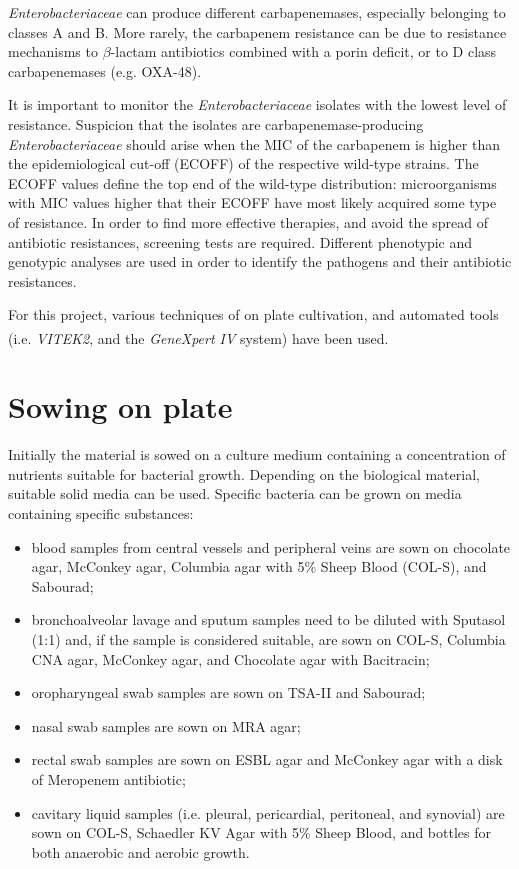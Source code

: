 \documentclass[11pt]{report}
\begin{document}
\emph{Enterobacteriaceae} can produce different carbapenemases, especially belonging to classes A and B.
More rarely, the carbapenem resistance can be due to resistance mechanisms to $\beta$-lactam antibiotics combined with a porin deficit, or to D class carbapenemases (e.g. OXA-48).

It is important to monitor the \emph{Enterobacteriaceae} isolates with the lowest level of resistance.
Suspicion that the isolates are carbapenemase-producing \emph{Enterobacteriaceae} should arise when the MIC of the carbapenem is higher than the epidemiological cut-off (ECOFF) of the respective wild-type strains.
The ECOFF values define the top end of the wild-type distribution: microorganisms with MIC values higher that their ECOFF have most likely acquired some type of resistance.
In order to find more effective therapies, and avoid the spread of antibiotic resistances, screening tests are required.
Different phenotypic and genotypic analyses are used in order to identify the pathogens and their antibiotic resistances.

For this project, various techniques of on plate cultivation, and automated tools (i.e. \emph{VITEK}\textsuperscript{\textregistered}\emph{2}, and the \emph{GeneXpert\textsuperscript{\textregistered} IV} system) have been used.

\section{Sowing on plate}
Initially the material is sowed on a culture medium containing a concentration of nutrients suitable for bacterial growth.
Depending on the biological material, suitable solid media can be used.
Specific bacteria can be grown on media containing specific substances:
\begin{itemize}
\item blood samples from central vessels and peripheral veins are sown on chocolate agar, McConkey agar, Columbia agar with 5$\%$ Sheep Blood (COL-S), and Sabourad;
\item bronchoalveolar lavage and sputum samples need to be diluted with Sputasol (1:1) and, if the sample is considered suitable, are sown on COL-S, Columbia CNA agar, McConkey agar, and Chocolate agar with Bacitracin;
\item oropharyngeal swab samples are sown on TSA-II and Sabourad;
\item nasal swab samples are sown on MRA agar;
\item rectal swab samples are sown on ESBL agar and McConkey agar with a disk of Meropenem antibiotic;
\item cavitary liquid samples (i.e. pleural, pericardial, peritoneal, and synovial) are sown on COL-S, Schaedler KV Agar with 5$\%$ Sheep Blood, and bottles for both anaerobic and aerobic growth.
\end{itemize}
\end{document}
